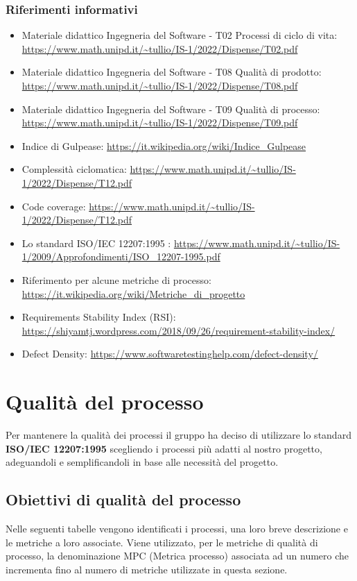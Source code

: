 \subsubsection{Riferimenti informativi}
\begin{itemize}
	\item Materiale didattico Ingegneria del Software - T02 Processi di ciclo di vita: \url{https://www.math.unipd.it/~tullio/IS-1/2022/Dispense/T02.pdf}
	\item Materiale didattico Ingegneria del Software - T08 Qualità di prodotto: \url{https://www.math.unipd.it/~tullio/IS-1/2022/Dispense/T08.pdf}
	\item Materiale didattico Ingegneria del Software - T09 Qualità di processo: \url{https://www.math.unipd.it/~tullio/IS-1/2022/Dispense/T09.pdf}
	\item Indice di Gulpease: \url{https://it.wikipedia.org/wiki/Indice_Gulpease}
	\item Complessità ciclomatica: \url{https://www.math.unipd.it/~tullio/IS-1/2022/Dispense/T12.pdf}
	\item Code coverage: \url{https://www.math.unipd.it/~tullio/IS-1/2022/Dispense/T12.pdf}	
	\item Lo standard ISO/IEC 12207:1995 : \url{https://www.math.unipd.it/~tullio/IS-1/2009/Approfondimenti/ISO_12207-1995.pdf}
	\item Riferimento per alcune metriche di processo: \url{https://it.wikipedia.org/wiki/Metriche_di_progetto}
	\item Requirements Stability Index (RSI): \\ \url{https://shiyamtj.wordpress.com/2018/09/26/requirement-stability-index/}
	\item Defect Density: \url{https://www.softwaretestinghelp.com/defect-density/}
\end{itemize}

\section{Qualità del processo}
Per mantenere la qualità dei processi il gruppo ha deciso di utilizzare lo standard \textbf{ISO/IEC 12207:1995} scegliendo i processi più adatti al nostro progetto, adeguandoli e semplificandoli in base alle necessità del progetto.

\subsection{Obiettivi di qualità del processo}
Nelle seguenti tabelle vengono identificati i processi, una loro breve descrizione e le metriche a loro associate. Viene utilizzato, per le metriche di qualità di processo, la denominazione MPC (Metrica processo) associata ad un numero che incrementa fino al numero di metriche utilizzate in questa sezione.
